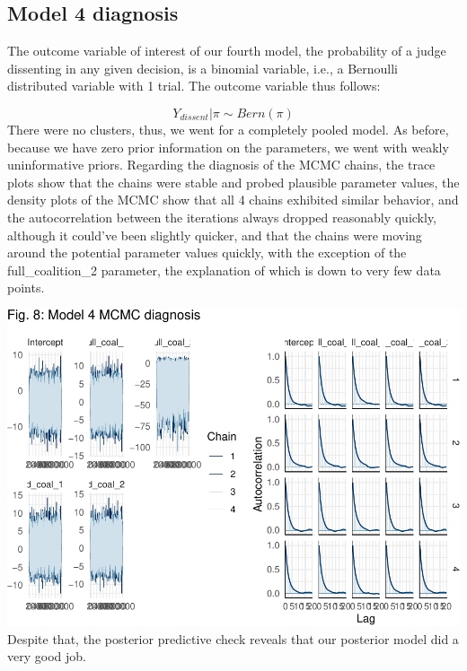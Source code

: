 \documentclass[
  11pt,
]{article}
\begin{document}
\hypertarget{model-4-diagnosis}{%
\subsection{Model 4 diagnosis}\label{model-4-diagnosis}}

The outcome variable of interest of our fourth model, the probability of
a judge dissenting in any given decision, is a binomial variable, i.e.,
a Bernoulli distributed variable with 1 trial. The outcome variable thus
follows:

\[ 
Y_{dissent} | \pi \sim Bern(\pi)
\] There were no clusters, thus, we went for a completely pooled model.
As before, because we have zero prior information on the parameters, we
went with weakly uninformative priors. Regarding the diagnosis of the
MCMC chains, the trace plots show that the chains were stable and probed
plausible parameter values, the density plots of the MCMC show that all
4 chains exhibited similar behavior, and the autocorrelation between the
iterations always dropped reasonably quickly, although it could've been
slightly quicker, and that the chains were moving around the potential
parameter values quickly, with the exception of the full\_coalition\_2
parameter, the explanation of which is down to very few data points.

\vspace{25pt}

\includegraphics{dissents_article_appendix_files/figure-latex/mcmc_diagnosis_coalition-1.pdf}
\vspace{25pt} Despite that, the posterior predictive check reveals that
our posterior model did a very good job.
\end{document}
